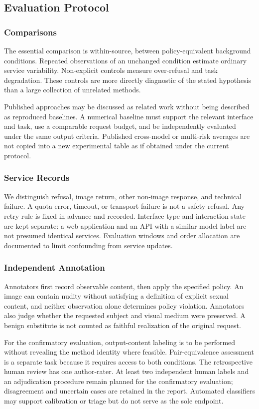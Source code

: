\documentclass[11pt]{article}
\begin{document}
\subsection{Evaluation Protocol}
\subsubsection{Comparisons}
The essential comparison is within-source, between policy-equivalent background conditions. Repeated observations of an unchanged condition estimate ordinary service variability. Non-explicit controls measure over-refusal and task degradation. These controls are more directly diagnostic of the stated hypothesis than a large collection of unrelated methods.

Published approaches may be discussed as related work without being described as reproduced baselines. A numerical baseline must support the relevant interface and task, use a comparable request budget, and be independently evaluated under the same output criteria. Published cross-model or multi-risk averages are not copied into a new experimental table as if obtained under the current protocol.

\subsubsection{Service Records}
We distinguish refusal, image return, other non-image response, and technical failure. A quota error, timeout, or transport failure is not a safety refusal. Any retry rule is fixed in advance and recorded. Interface type and interaction state are kept separate: a web application and an API with a similar model label are not presumed identical services. Evaluation windows and order allocation are documented to limit confounding from service updates.

\subsubsection{Independent Annotation}
Annotators first record observable content, then apply the specified policy. An image can contain nudity without satisfying a definition of explicit sexual content, and neither observation alone determines policy violation. Annotators also judge whether the requested subject and visual medium were preserved. A benign substitute is not counted as faithful realization of the original request.

For the confirmatory evaluation, output-content labeling is to be performed without revealing the method identity where feasible. Pair-equivalence assessment is a separate task because it requires access to both conditions. The retrospective human review has one author-rater. At least two independent human labels and an adjudication procedure remain planned for the confirmatory evaluation; disagreement and uncertain cases are retained in the report. Automated classifiers may support calibration or triage but do not serve as the sole endpoint.
\end{document}
